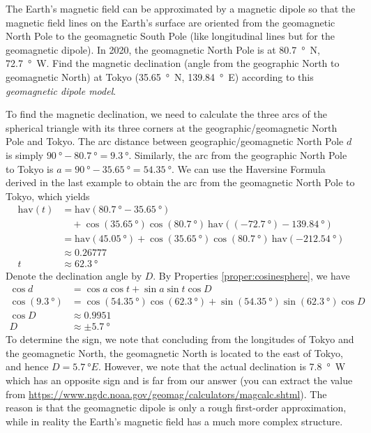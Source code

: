 \begin{exmp}
The Earth's magnetic field can be approximated by a magnetic dipole so that the magnetic field lines on the Earth's surface are oriented from the geomagnetic North Pole to the geomagnetic South Pole (like longitudinal lines but for the geomagnetic dipole). In 2020, the geomagnetic North Pole is at \SI{80.7}{\degree N}, \SI{72.7}{\degree W}. Find the magnetic declination (angle from the geographic North to geomagnetic North) at Tokyo (\SI{35.65}{\degree N}, \SI{139.84}{\degree E}) according to this \textit{geomagnetic dipole model}.
\end{exmp}
\begin{solution}
To find the magnetic declination, we need to calculate the three arcs of the spherical triangle with its three corners at the geographic/geomagnetic North Pole and Tokyo. The arc distance between geographic/geomagnetic North Pole $d$ is simply $\SI{90}{\degree} - \SI{80.7}{\degree} = \SI{9.3}{\degree}$. Similarly, the arc from the geographic North Pole to Tokyo is $a = \SI{90}{\degree} - \SI{35.65}{\degree} = \SI{54.35}{\degree}$. We can use the Haversine Formula derived in the last example to obtain the arc from the geomagnetic North Pole to Tokyo, which yields
\begin{align*}
\text{hav}(t) &= \text{hav}(\SI{80.7}{\degree} - \SI{35.65}{\degree}) \\ 
&\quad + \cos(\SI{35.65}{\degree}) \cos(\SI{80.7}{\degree})\ \text{hav}((\SI{-72.7}{\degree}) - \SI{139.84}{\degree}) \\
&= \text{hav}(\SI{45.05}{\degree}) + \cos(\SI{35.65}{\degree}) \cos(\SI{80.7}{\degree})\ \text{hav}(\SI{-212.54}{\degree}) \\
&\approx 0.26777 \\
t &\approx \SI{62.3}{\degree}
\end{align*}
Denote the declination angle by $D$. By Properties \ref{proper:cosinesphere}, we have
\begin{align*}
\cos d &= \cos a \cos t + \sin a \sin t \cos D \\
\cos (\SI{9.3}{\degree}) &= \cos (\SI{54.35}{\degree}) \cos (\SI{62.3}{\degree}) + \sin (\SI{54.35}{\degree}) \sin (\SI{62.3}{\degree}) \cos D \\
\cos D &\approx 0.9951 \\
D &\approx \pm \SI{5.7}{\degree}
\end{align*}
To determine the sign, we note that concluding from the longitudes of Tokyo and the geomagnetic North, the geomagnetic North is located to the east of Tokyo, and hence $D = \SI{5.7}{\degree E}$. However, we note that the actual declination is \SI{7.8}{\degree W} which has an opposite sign and is far from our answer (you can extract the value from \href{https://www.ngdc.noaa.gov/geomag/calculators/magcalc.shtml}{https://www.ngdc.noaa.gov/geomag/calculators/magcalc.shtml}). The reason is that the geomagnetic dipole is only a rough first-order approximation, while in reality the Earth's magnetic field has a much more complex structure.
\end{solution}

